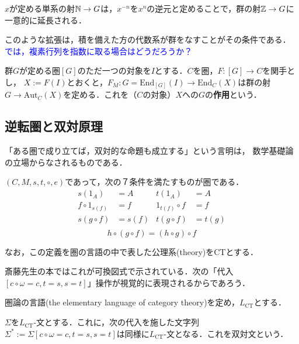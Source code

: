 \documentclass[uplatex, dvipdfmx]{jsreport}
\begin{document}
\begin{example}[群の射の例]
    $x$が定める単系の射$\mathbb{N}\to G$は，$x^{-n}$を$x^n$の逆元と定めることで，群の射$\mathbb{Z}\to G$に一意的に延長される．
\end{example}
\begin{remark}
    このような拡張は，積を備えた方の代数系が群をなすことがその条件である．
    \textcolor{blue}{では，複素行列を指数に取る場合はどうだろうか？}
\end{remark}

\begin{definition}
    群$G$が定める圏$[G]$のただ一つの対象を$I$とする．$C$を圏，$F:[G]\to C$を関手とし，
    $X:=F(I)$とおくと，$F_M:G=\mathrm{End}_{[G]}(I)\to \mathrm{End}_C(X)$は群の射
    $G\to\mathrm{Aut}_C(X)$を定める．これを（$C$の対象）$X$への$G$の\textbf{作用}という．
\end{definition}

\subsection{逆転圏と双対原理}

「ある圏で成り立てば，双対的な命題も成立する」という言明は，
数学基礎論の立場からなされるものである．

\begin{definition*}[圏の形式的定義]
    $(C,M,s,t,\circ,e)$であって，次の７条件を満たすものが圏である．
    \begin{align*}
        s(1_A) &=A & t(1_A) &=A \\
        f\circ 1_{s(f)} &=f & 1_{t(f)}\circ f &=f \\
        s(g\circ f) &= s(f)& t(g\circ f) &= t(g) \\
    \end{align*}
    \[h\circ (g\circ f) = (h\circ g)\circ f\]

    なお，この定義を圏の言語の中で表した公理系(theory)をCTとする．
\end{definition*}
斎藤先生の本ではこれが可換図式で示されている．次の「代入$[c\circ\omega =c, t=s,s=t]$」操作が視覚的に表現されるからであろう．

\begin{definition*}[圏の言語]
    圏論の言語(the elementary language of category theory)を定め，$L_{\mathrm{CT}}$とする．
\end{definition*}

\begin{definition*}[双対文]
    $\Sigma$を$L_{\mathrm{CT}}$-文とする．これに，次の代入を施した文字列$\Sigma^*:=\Sigma[c\circ\omega =c, t=s,s=t]$は同様に$L_{\mathrm{CT}}$-文となる．これを双対文という．
\end{definition*}
\end{document}
